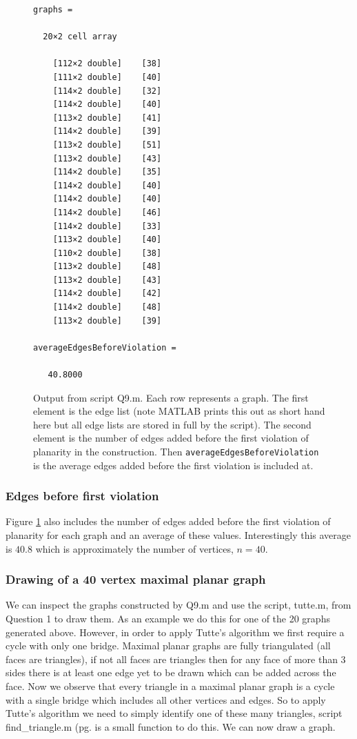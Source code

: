 \documentclass[a4paper]{article}
\begin{document}
\begin{figure}
    \centering
    \begin{verbatim}
graphs =

  20×2 cell array

    [112×2 double]    [38]
    [111×2 double]    [40]
    [114×2 double]    [32]
    [114×2 double]    [40]
    [113×2 double]    [41]
    [114×2 double]    [39]
    [113×2 double]    [51]
    [113×2 double]    [43]
    [114×2 double]    [35]
    [114×2 double]    [40]
    [114×2 double]    [40]
    [114×2 double]    [46]
    [114×2 double]    [33]
    [113×2 double]    [40]
    [110×2 double]    [38]
    [113×2 double]    [48]
    [113×2 double]    [43]
    [114×2 double]    [42]
    [114×2 double]    [48]
    [113×2 double]    [39]
    
averageEdgesBeforeViolation =

   40.8000
    \end{verbatim}
    \caption{Output from script Q9.m. Each row represents a graph. The first element is the edge list (note MATLAB prints this out as short hand here but all edge lists are stored in full by the script). The second element is the number of edges added before the first violation of planarity in the construction. Then \texttt{averageEdgesBeforeViolation} is the average edges added before the first violation is included at.}
    \label{fig:Q9b}
\end{figure}

\subsubsection*{Edges before first violation}
Figure \ref{fig:Q9b} also includes the number of edges added before the first violation of planarity for each graph and an average of these values. Interestingly this average is $40.8$ which is approximately the number of vertices, $n=40$.

\subsubsection*{Drawing of a 40 vertex maximal planar graph}

We can inspect the graphs constructed by Q9.m and use the script, tutte.m, from Question 1 to draw them. As an example we do this for one of the 20 graphs generated above. However, in order to apply Tutte's algorithm we first require a cycle with only one bridge. Maximal planar graphs are fully triangulated (all faces are triangles), if not all faces are triangles then for any face of more than 3 sides there is at least one edge yet to be drawn which can be added across the face. Now we observe that every triangle in a maximal planar graph is a cycle with a single bridge which includes all other vertices and edges. So to apply Tutte's algorithm we need to simply identify one of these many triangles, script find\_triangle.m (pg.\pageref{Pfind_triangle} is a small function to do this. We can now draw a graph.
\end{document}
